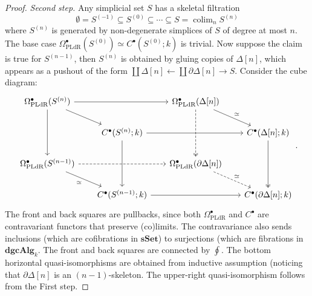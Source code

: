 \documentclass[psamsfonts]{amsart}
\theoremstyle{definition}
\theoremstyle{remark}
\newcommand{\dgcAlg}{\mathbf{dgcAlg}}
\newcommand{\sSet}{\mathbf{sSet}}
\DeclareMathOperator*\colim{colim}
\numberwithin{equation}{section}
\begin{document}
\begin{proof}
\textit{Second step.}
Any simplicial set $S$ has a skeletal filtration
\[\emptyset=S^{(-1)}\subseteq S^{(0)}\subseteq\cdots\subseteq S=\textstyle{\colim_nS^{(n)}}\]
where $S^{(n)}$ is generated by non-degenerate simplices of $S$ of degree at most $n$. The base case $\Omega^\bullet_\textrm{PLdR}(S^{(0)})\simeq C^\bullet(S^{(0)};k)$ is trivial. Now suppose the claim is true for $S^{(n-1)}$, then $S^{(n)}$ is obtained by gluing copies of $\Delta[n]$, which appears as a pushout of the form $\coprod\Delta[n]\leftarrow\coprod\partial\Delta[n]\rightarrow S$. Consider the cube diagram:
\[\begin{tikzcd}[column sep=scriptsize]
\Omega^\bullet_\textrm{PLdR}(S^{(n)})\arrow[dd]\arrow[dr]\arrow[rr]&&\Omega^\bullet_\textrm{PLdR}(\Delta[n])\arrow[dd,dashed,two heads]\arrow[dr,"\simeq"]\\
&C^\bullet(S^{(n)};k)\arrow[dd]\arrow[rr]&&C^\bullet(\Delta[n];k)\arrow[dd,two heads]\\
\Omega^\bullet_\textrm{PLdR}(S^{(n-1)})\arrow[dr,"\simeq"']\arrow[rr,dashed]&&\Omega^\bullet_\textrm{PLdR}(\partial\Delta[n])\arrow[dr,dashed,"\simeq"]\\
&C^\bullet(S^{(n-1)};k)\arrow[rr]&&C^\bullet(\partial\Delta[n];k)
\end{tikzcd}.\]
The front and back squares are pullbacks, since both $\Omega^\bullet_\textrm{PLdR}$ and $C^\bullet$ are contravariant functors that preserve (co)limits. The contravariance also sends inclusions (which are cofibrations in $\sSet$) to surjections (which are fibrations in $\dgcAlg_k$. The front and back squares are connected by $\oint$. The bottom horizontal quasi-isomorphisms are obtained from inductive assumption (noticing that $\partial\Delta[n]$ is an $(n-1)$-skeleton. The upper-right quasi-isomorphism follows from the First step.
\end{proof}
\end{document}

